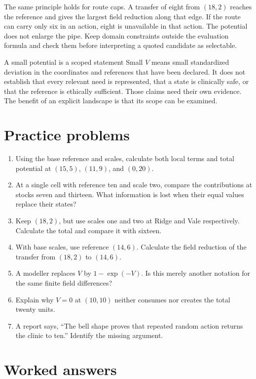 The same principle holds for route caps. A transfer of eight from \((18,2)\) reaches the reference and gives the largest field reduction along that edge. If the route can carry only six in an action, eight is unavailable in that action. The potential does not enlarge the pipe. Keep domain constraints outside the evaluation formula and check them before interpreting a quoted candidate as selectable.

\begin{cautionbox}{A small potential is a scoped statement}
Small \(V\) means small standardized deviation in the coordinates and references that have been declared. It does not establish that every relevant need is represented, that a state is clinically safe, or that the reference is ethically sufficient. Those claims need their own evidence. The benefit of an explicit landscape is that its scope can be examined.
\end{cautionbox}

\section{Practice problems}

\begin{enumerate}
\item Using the base reference and scales, calculate both local terms and total potential at \((15,5)\), \((11,9)\), and \((0,20)\).
\item At a single cell with reference ten and scale two, compare the contributions at stocks seven and thirteen. What information is lost when their equal values replace their states?
\item Keep \((18,2)\), but use scales one and two at Ridge and Vale respectively. Calculate the total and compare it with sixteen.
\item With base scales, use reference \((14,6)\). Calculate the field reduction of the transfer from \((18,2)\) to \((14,6)\).
\item A modeller replaces \(V\) by \(1-\exp(-V)\). Is this merely another notation for the same finite field differences?
\item Explain why \(V=0\) at \((10,10)\) neither consumes nor creates the total twenty units.
\item A report says, ``The bell shape proves that repeated random action returns the clinic to ten.'' Identify the missing argument.
\end{enumerate}

\section{Worked answers}

